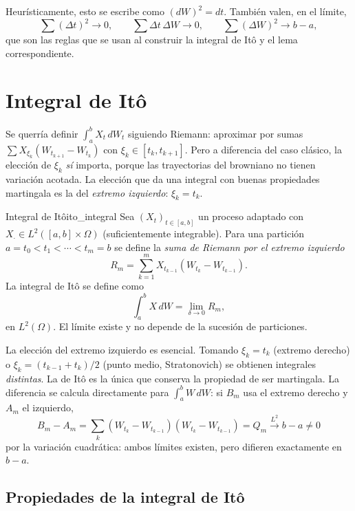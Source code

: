 \documentclass[11pt, a4paper]{article}
\begin{document}
\obs Heurísticamente, esto se escribe como $(dW)^2 = dt$. También valen, en el límite,
$$ \sum (\Delta t)^2 \to 0, \qquad \sum \Delta t \, \Delta W \to 0, \qquad \sum (\Delta W)^2 \to b
- a, $$
que son las reglas que se usan al construir la integral de Itô y el lema correspondiente.

\newpage

\section{Integral de Itô}

Se querría definir $\int_a^b X_t \, dW_t$ siguiendo Riemann: aproximar por sumas
$\sum X_{\xi_k} (W_{t_{k+1}} - W_{t_k})$ con $\xi_k \in [t_k, t_{k+1}]$. Pero a diferencia del
caso clásico, la elección de $\xi_k$ \emph{sí} importa, porque las trayectorias del browniano
no tienen variación acotada. La elección que da una integral con buenas propiedades martingala
es la del \emph{extremo izquierdo}: $\xi_k = t_k$.

\begin{definicion}{Integral de Itô}{ito_integral}
Sea $(X_t)_{t \in [a, b]}$ un proceso adaptado con $X_\cdot \in L^2([a, b] \times \Omega)$
(suficientemente integrable).
Para una partición $a = t_0 < t_1 < \cdots < t_m = b$ se define la \emph{suma de Riemann por el
extremo izquierdo}
$$ R_m = \sum_{k=1}^m X_{t_{k-1}} (W_{t_k} - W_{t_{k-1}}). $$
La integral de Itô se define como
$$ \int_a^b X \, dW = \lim_{\delta \to 0} R_m, $$
en $L^2(\Omega)$. El límite existe y no depende de la sucesión de particiones.
\end{definicion}

\obs La elección del extremo izquierdo es esencial. Tomando $\xi_k = t_k$ (extremo derecho) o
$\xi_k = (t_{k-1} + t_k)/2$ (punto medio, Stratonovich) se obtienen integrales \emph{distintas}.
La de Itô es la única que conserva la propiedad de ser martingala. La diferencia se
calcula directamente para $\int_a^b W \, dW$: si $B_m$ usa el extremo derecho y $A_m$ el
izquierdo,
$$ B_m - A_m = \sum_k \left( W_{t_k} - W_{t_{k-1}} \right) \left( W_{t_k} - W_{t_{k-1}} \right)
= Q_m \xrightarrow{L^2} b - a \ne 0 $$
por la variación cuadrática: ambos límites existen, pero difieren exactamente en $b - a$.

\subsection{Propiedades de la integral de Itô}
\end{document}
